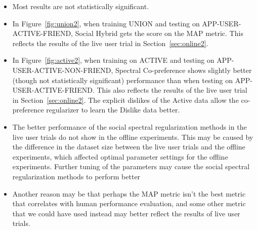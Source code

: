 \begin{itemize}
\item{Most results are not statistically significant.}

\item{In Figure~\ref{fig:union2}, when training UNION and testing on APP-USER-ACTIVE-FRIEND, Social Hybrid gets the score on the MAP metric. This reflects the results of the live user trial in Section~\ref{sec:online2}.}

\item{ In Figure~\ref{fig:active2}, when training on ACTIVE and testing on APP-USER-ACTIVE-NON-FRIEND, Spectral Co-preference shows slightly better (though not statistically significant) performance than when testing on APP-USER-ACTIVE-FRIEND. This also reflects the results of the live user trial in Section~\ref{sec:online2}. The explicit dislikes of the Active data allow the co-preference regularizer to learn the Dislike data better.}

\item{The better performance of the social spectral regularization methods in the live user trials do not show in the offline experiments. This may be caused by the difference in the dataset size between the live user trials and the offline experiments, which affected optimal parameter settings for the offline experiments. Further tuning of the parameters may cause the social spectral regularization methods to perform better}

\item{Another reason may be that perhaps the MAP metric isn't the best metric that correlates with human performance evaluation, and some other metric that we could have used instead may better reflect the results of live user trials.}
\end{itemize}


